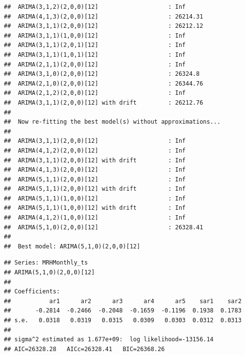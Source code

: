 \documentclass[12pt,]{article}
\begin{document}
\begin{verbatim}
##  ARIMA(3,1,2)(2,0,0)[12]                    : Inf
##  ARIMA(4,1,3)(2,0,0)[12]                    : 26214.31
##  ARIMA(3,1,1)(2,0,0)[12]                    : 26212.12
##  ARIMA(3,1,1)(1,0,0)[12]                    : Inf
##  ARIMA(3,1,1)(2,0,1)[12]                    : Inf
##  ARIMA(3,1,1)(1,0,1)[12]                    : Inf
##  ARIMA(2,1,1)(2,0,0)[12]                    : Inf
##  ARIMA(3,1,0)(2,0,0)[12]                    : 26324.8
##  ARIMA(2,1,0)(2,0,0)[12]                    : 26344.76
##  ARIMA(2,1,2)(2,0,0)[12]                    : Inf
##  ARIMA(3,1,1)(2,0,0)[12] with drift         : 26212.76
## 
##  Now re-fitting the best model(s) without approximations...
## 
##  ARIMA(3,1,1)(2,0,0)[12]                    : Inf
##  ARIMA(4,1,2)(2,0,0)[12]                    : Inf
##  ARIMA(3,1,1)(2,0,0)[12] with drift         : Inf
##  ARIMA(4,1,3)(2,0,0)[12]                    : Inf
##  ARIMA(5,1,1)(2,0,0)[12]                    : Inf
##  ARIMA(5,1,1)(2,0,0)[12] with drift         : Inf
##  ARIMA(5,1,1)(1,0,0)[12]                    : Inf
##  ARIMA(5,1,1)(1,0,0)[12] with drift         : Inf
##  ARIMA(4,1,2)(1,0,0)[12]                    : Inf
##  ARIMA(5,1,0)(2,0,0)[12]                    : 26328.41
## 
##  Best model: ARIMA(5,1,0)(2,0,0)[12]
\end{verbatim}

\begin{verbatim}
## Series: MRHMonthly_ts 
## ARIMA(5,1,0)(2,0,0)[12] 
## 
## Coefficients:
##           ar1      ar2      ar3      ar4      ar5    sar1    sar2
##       -0.2814  -0.2466  -0.2048  -0.1659  -0.1196  0.1938  0.1783
## s.e.   0.0318   0.0319   0.0315   0.0309   0.0303  0.0312  0.0313
## 
## sigma^2 estimated as 1.677e+09:  log likelihood=-13156.14
## AIC=26328.28   AICc=26328.41   BIC=26368.26
\end{verbatim}
\end{document}

